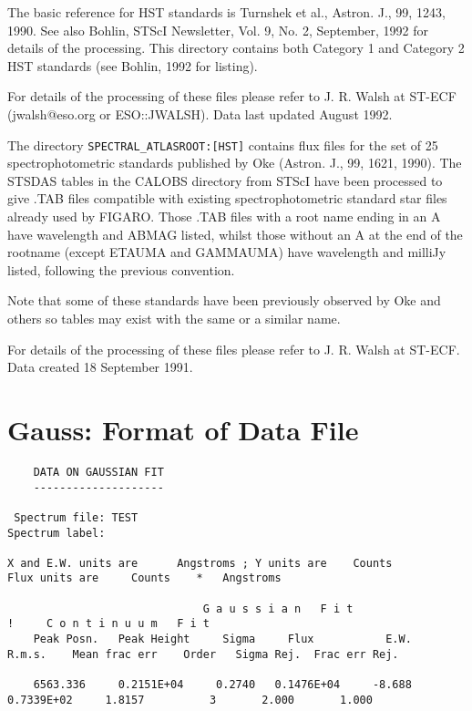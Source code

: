The basic reference for HST standards is Turnshek et al., Astron.  J.,
99, 1243, 1990. See also Bohlin, STScI Newsletter, Vol. 9, No. 2,
September, 1992 for details of the processing. This directory contains
both Category 1 and Category 2 HST standards (see Bohlin, 1992 for
listing).

For details of the processing of these files please refer to J. R.
Walsh at ST-ECF (jwalsh@eso.org or ESO::JWALSH).  Data last updated
August 1992.

The directory {\tt SPECTRAL\_ATLASROOT:[HST]} contains flux files for
the set of 25 spectrophotometric standards published by Oke (Astron. J.,
99, 1621, 1990). The STSDAS tables in the CALOBS directory from STScI
have been processed to give .TAB files compatible with existing
spectrophotometric standard star files already used by FIGARO.  Those
.TAB files with a root name ending in an A have wavelength and ABMAG
listed, whilst those without an A at the end of the rootname (except
ETAUMA and GAMMAUMA) have wavelength and milliJy listed, following the
previous convention.

Note that some of these standards have been previously observed
by Oke and others so tables may exist with the same or a similar
name.

For details of the processing of these files please refer to J. R.
Walsh at ST-ECF.  Data created 18 September 1991.


\section{Gauss: Format of Data File}

\vspace{5mm}
\begin{tiny}
\begin{verbatim}
    DATA ON GAUSSIAN FIT
    --------------------

 Spectrum file: TEST                            
Spectrum label: 

X and E.W. units are      Angstroms ; Y units are    Counts                 
Flux units are     Counts    *   Angstroms                 

                              G a u s s i a n   F i t                                                        !     C o n t i n u u m   F i t
    Peak Posn.   Peak Height     Sigma     Flux           E.W.    R.m.s.    Mean frac err    Order   Sigma Rej.  Frac err Rej.

    6563.336     0.2151E+04     0.2740   0.1476E+04     -8.688  0.7339E+02     1.8157          3       2.000       1.000
\end{verbatim}
\end{tiny}
\vspace{5mm}

